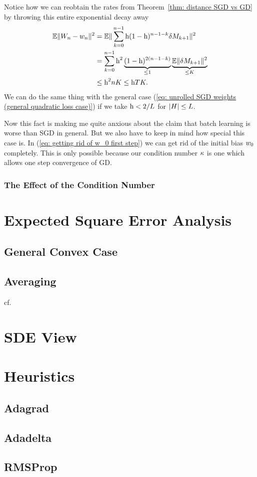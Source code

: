 Notice how we can reobtain the rates from Theorem~\ref{thm: distance SGD vs GD}
by throwing this entire exponential decay away
\begin{align*}
	\mathbb{E}\|W_n-w_n\|^2
	&= \mathbb{E}\|\sum_{k=0}^{n-1}\text{h}(1-\text{h})^{n-1-k}\delta M_{k+1}\|^2\\
	&= \sum_{k=0}^{n-1}\text{h}^2\underbrace{(1-\text{h})^{2(n-1-k)}}_{\le1}
	\underbrace{\mathbb{E}\|\delta M_{k+1}\|^2}_{\le K}\\
	&\le \text{h}^2 n K \le \text{h} TK.
\end{align*}
We can do the same thing with the general case (\ref{eq: unrolled SGD weights
(general quadratic loss case)}) if we take \(\text{h}<2/L\) for \(|H|\le L\).

Now this fact is making me quite anxious about the claim that batch learning is
worse than SGD in general. But we also have to keep in mind how special this
case is. In (\ref{eq: getting rid of w_0 first step}) we can get rid of the
initial bias \(w_0\) completely. This is only possible because our
condition number \(\kappa\) is one which allows one step convergence of GD.

\subsubsection{The Effect of the Condition Number}



\section{Expected Square Error Analysis}


\subsection{General Convex Case}

\textcite{nemirovskiRobustStochasticApproximation2009}


\subsection{Averaging}

cf. \cite{bachNonstronglyconvexSmoothStochastic2013}

\section{SDE View}

\textcite{simsekliTailIndexAnalysisStochastic2019}


\section{Heuristics}

\subsection{Adagrad}

\subsection{Adadelta}

\subsection{RMSProp}


\endinput
